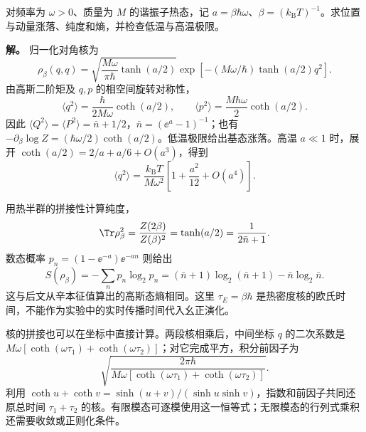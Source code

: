 \begin{example}[正交分量涨落与热纯度]
对频率为 $\omega>0$、质量为 $M$ 的谐振子热态，记 $a=\beta\hbar\omega$、$\beta=(k_{\mathrm B}T)^{-1}$。求位置与动量涨落、纯度和熵，并检查低温与高温极限。

\textbf{解。} \label{ex:phys-ghs-thermal-fluctuations}
归一化对角核为
\[
\rho_\beta(q,q)=\sqrt{\frac{M\omega}{\pi\hbar}\tanh(a/2)}
\exp[-(M\omega/\hbar)\tanh(a/2)q^2].
\]
由高斯二阶矩及 $q,p$ 的相空间旋转对称性，
\[
\langle q^2\rangle=\frac{\hbar}{2M\omega}\coth(a/2),\qquad
\langle p^2\rangle=\frac{M\hbar\omega}{2}\coth(a/2).
\]
因此 $\langle Q^2\rangle=\langle P^2\rangle=\bar n+1/2$，$\bar n=(\ee^a-1)^{-1}$；也有 $-\partial_\beta\log Z=(\hbar\omega/2)\coth(a/2)$。低温极限给出基态涨落。高温 $a\ll1$ 时，展开 $\coth(a/2)=2/a+a/6+O(a^3)$，得到
\[
\langle q^2\rangle=\frac{k_{\mathrm B}T}{M\omega^2}
\left[1+\frac{a^2}{12}+O(a^4)\right].
\]

用热半群的拼接性计算纯度，
\[
\Tr\rho_\beta^2=\frac{Z(2\beta)}{Z(\beta)^2}
=\tanh(a/2)=\frac1{2\bar n+1}.
\]
数态概率 $p_n=(1-\ee^{-a})\ee^{-an}$ 则给出
\[
S(\rho_\beta)=-\sum_n p_n\log_2p_n
=(\bar n+1)\log_2(\bar n+1)-\bar n\log_2\bar n.
\]
这与后文从辛本征值算出的高斯态熵相同。这里 $\tau_E=\beta\hbar$ 是热密度核的欧氏时间，不能作为实验中的实时传播时间代入幺正演化。
\end{example}

核的拼接也可以在坐标中直接计算。两段核相乘后，中间坐标 $q$ 的二次系数是 $M\omega[\coth(\omega\tau_1)+\coth(\omega\tau_2)]$；对它完成平方，积分前因子为
\[
\sqrt{\frac{2\pi\hbar}
{M\omega[\coth(\omega\tau_1)+\coth(\omega\tau_2)]}}.
\]
利用 $\coth u+\coth v=\sinh(u+v)/(\sinh u\sinh v)$，指数和前因子共同还原总时间 $\tau_1+\tau_2$ 的核。有限模态可逐模使用这一恒等式；无限模态的行列式乘积还需要收敛或正则化条件。
